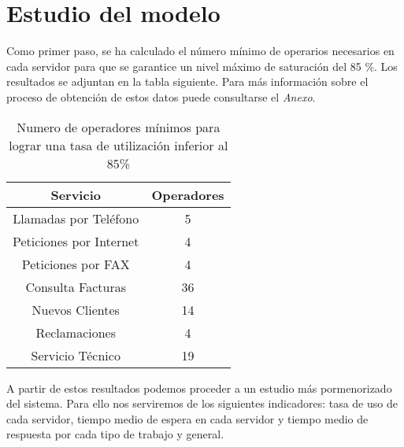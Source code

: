 \section{Estudio del modelo}
Como primer paso, se ha calculado el número mínimo de operarios necesarios en cada servidor para que se garantice un nivel máximo de saturación del 85 \%. Los resultados se adjuntan en la tabla siguiente. Para más información sobre el proceso de obtención de estos datos puede consultarse el \textit{Anexo}.
\begin{table}[H]
  \begin{center}
  \begin{tabular}{|c|c|}
    \hline
    \textbf{Servicio}       & \textbf{Operadores} \\ \hline
    Llamadas por Teléfono   & 5                   \\ \hline
    Peticiones por Internet & 4                   \\ \hline
    Peticiones por FAX      & 4                   \\ \hline
    Consulta Facturas      & 36                   \\ \hline
    Nuevos Clientes      & 14                   \\ \hline
    Reclamaciones      & 4                   \\ \hline
    Servicio Técnico      & 19                   \\ \hline
  \end{tabular}
\end{center}
  \caption{Numero de operadores mínimos para lograr una tasa de utilización inferior al 85\%}
\end{table}
A partir de estos resultados podemos proceder a un estudio más pormenorizado del sistema. Para ello nos serviremos de los siguientes indicadores: tasa de uso de cada servidor, tiempo medio de espera en cada servidor y tiempo medio de respuesta por cada tipo de trabajo y general.
